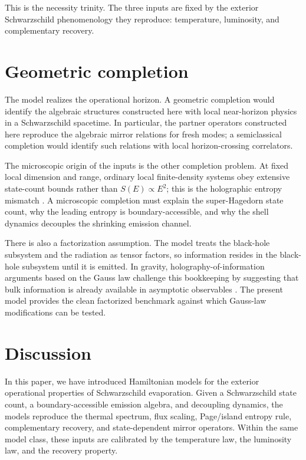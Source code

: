 \documentclass[12pt]{article}
\begin{document}
This is the necessity trinity.  The three inputs are fixed by the exterior
Schwarzschild phenomenology they reproduce: temperature, luminosity, and
complementary recovery.

\section{Geometric completion}

The model realizes the operational horizon.  A geometric completion would
identify the algebraic structures constructed here with local near-horizon
physics in a Schwarzschild spacetime.  In particular, the partner operators
constructed here reproduce the algebraic mirror relations for fresh modes; a
semiclassical completion would identify such relations with local
horizon-crossing correlators.

The microscopic origin of the inputs is the other completion problem.  At fixed
local dimension and range, ordinary local finite-density systems obey
extensive state-count bounds rather than $S(E)\propto E^2$; this is the
holographic entropy mismatch
\cite{Bekenstein1981,tHooft1993,Susskind1995,Bousso2002,
CohenKaplanNelson1999,Yurtsever2003}.  A microscopic completion must explain the
super-Hagedorn state count, why the leading entropy is boundary-accessible,
and why the shell dynamics decouples the shrinking emission channel.

There is also a factorization assumption.  The model treats the black-hole
subsystem and the radiation as tensor factors, so information resides in the
black-hole subsystem until it is emitted.  In gravity, holography-of-information
arguments based on the Gauss law challenge this bookkeeping by suggesting that
bulk information is already available in asymptotic observables
\cite{Raju2022}.  The present model provides the clean factorized benchmark
against which Gauss-law modifications can be tested.

\section{Discussion}

In this paper, we have introduced Hamiltonian models for the exterior
operational properties of Schwarzschild evaporation.  Given a Schwarzschild
state count, a boundary-accessible emission algebra, and decoupling dynamics,
the models reproduce the thermal spectrum, flux scaling, Page/island entropy
rule, complementary recovery, and state-dependent mirror operators.  Within
the same model class, these inputs are calibrated by the temperature law, the
luminosity law, and the recovery property.
\end{document}
